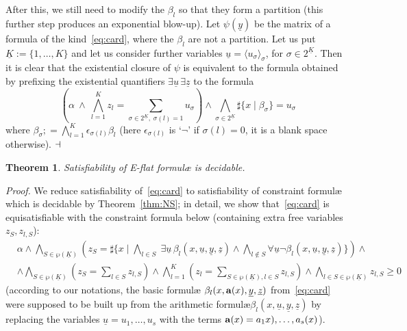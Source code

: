 \documentclass[11pt,a4paper]{article}
\newcommand{\formulae}{formul\ae\xspace}
\newcommand{\uu}{\ensuremath{\underline u}}
\newcommand{\uy}{\ensuremath{\underline y}}
\newcommand{\uz}{\ensuremath{\underline z}}
\newcommand{\ta}{\ensuremath{{\bf a}}\xspace}
\newtheorem{theorem}{Theorem}
\begin{document}
 
After this, we still need to modify the $\beta_l$ so that they form a
 partition (this further step produces an exponential blow-up). Let  $\psi(\uy)$ be the matrix of a formula of the kind~\eqref{eq:card}, where the $\beta_l$ are 
 not a partition. Let us put $\underline K:=\{1, \dots, K\}$ and let us consider further variables $\uu=\langle u_{\sigma}\rangle_{\sigma}$, for $\sigma\in 2^{\underline K} $.
 Then it is clear that the existential closure of $\psi$ is equivalent to the formula obtained by prefixing the existential quantifiers $\exists \uu \,\exists \uz$ to the  formula
 \begin{equation}\label{eq:card0}
\left(\alpha~ \wedge~ \bigwedge_{l=1}^K  z_l = \sum_{\sigma\in 2^{\underline{K}},\;\sigma(l)=1} u_{\sigma}\right)
\wedge \bigwedge_{\sigma\in 2^{\underline{K}}}\sharp\{x\mid \beta_{\sigma}\} =u_{\sigma}  
\end{equation}
where $\beta_{\sigma};= \bigwedge_{l=1}^K \epsilon_{\sigma(l)} \beta_l$ (here $\epsilon_{\sigma(l)}$ is `$\neg$' if $\sigma(l)=0$, it is 
a blank space otherwise).
$\hfill\dashv$


\begin{theorem}\label{thm:main}
 Satisfiability of E-flat  \formulae is decidable.
\end{theorem}

\noindent
\textit{Proof.} 
 We reduce satisfiability of~\eqref{eq:card} to satisfiability of constraint \formulae
which is decidable by Theorem~\ref{thm:NS}; in detail,
 we show that~\eqref{eq:card} is equisatisfiable with 
the constraint formula below (containing extra free variables $z_{S}, z_{l, S}$):
\begin{equation}\label{eq:card1}
\begin{aligned}
  & \alpha \wedge \bigwedge_{S\in \wp(\underline K)} \left( z_{S} = \sharp \{ x\mid \bigwedge_{l\in  S} \;\exists \uu \, \beta_l(x,\uu,\uy,\uz) \wedge
   \bigwedge_{l\not\in S} \forall \uu \neg \beta_l(x,\uu,\uy,\uz)\}\right )  \wedge
   \\
   & \wedge \bigwedge_{ S\in \wp(\underline K)} \left( z_{ S} = \sum_{l\in S} z_{l, S} \right) \wedge \bigwedge_{l=1}^K 
   \left( z_l = \sum_{S\in \wp(\underline K), l\in S} z_{l,S}\right) \wedge  \bigwedge_{ l\in S\in \wp(\underline K)} z_{l,S}\geq 0
  \end{aligned}
\end{equation}
(according to our notations, the basic \formulae
$\beta_l(x, \ta(x), \uy, \uz)$ from~\eqref{eq:card} 
were supposed to be built up from the arithmetic \formulae $\beta_l(x, \uu, \uy, \uz)$ by replacing the variables $\uu= u_1, \dots, u_s$ with 
the terms $\ta(x)= a_1x), \dots, a_s(x)$). 
\end{document}
